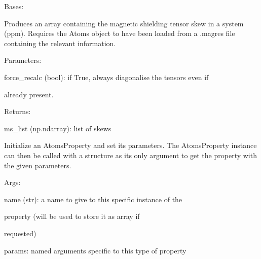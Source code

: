 \documentclass[letterpaper,10pt,english]{sphinxmanual}
\begin{document}
\begin{fulllineitems}
\label{doctree/soprano.properties.nmr.ms:soprano.properties.nmr.ms.MSSkew}
Bases: {\hyperref[doctree/soprano.properties.atomsproperty:soprano.properties.atomsproperty.AtomsProperty]{\emph{}}}

Produces an array containing the magnetic shielding tensor skew
in a system (ppm).
Requires the Atoms object to have been loaded from a .magres file
containing the relevant information.

\begin{DUlineblock}{0em}
\item[] Parameters:
\item[]
\begin{DUlineblock}{\DUlineblockindent}
\item[] force\_recalc (bool): if True, always diagonalise the tensors even if
\item[]
\begin{DUlineblock}{\DUlineblockindent}
\item[] already present.
\end{DUlineblock}
\end{DUlineblock}
\end{DUlineblock}

\begin{DUlineblock}{0em}
\item[] Returns:
\item[]
\begin{DUlineblock}{\DUlineblockindent}
\item[] ms\_list (np.ndarray): list of skews
\end{DUlineblock}
\end{DUlineblock}

Initialize an AtomsProperty and set its parameters.
The AtomsProperty instance can then be called with a structure as its
only argument to get the property with the given parameters.

\begin{DUlineblock}{0em}
\item[] Args:
\item[]
\begin{DUlineblock}{\DUlineblockindent}
\item[] name (str): a name to give to this specific instance of the
\item[]
\begin{DUlineblock}{\DUlineblockindent}
\item[] property (will be used to store it as array if
\item[] requested)
\end{DUlineblock}
\item[] params: named arguments specific to this type of property
\end{DUlineblock}
\end{DUlineblock}


\end{fulllineitems}
\end{document}
